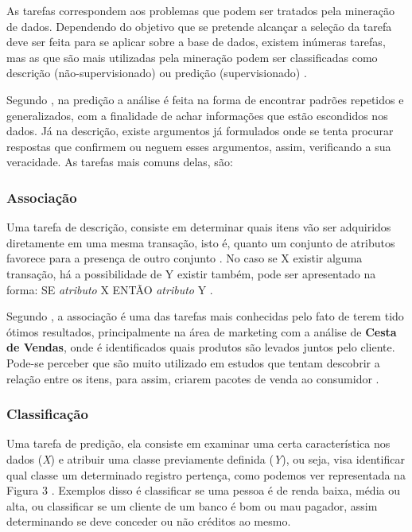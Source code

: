 \par

As tarefas correspondem aos problemas que podem ser tratados pela mineração de dados. Dependendo do objetivo que se pretende alcançar a seleção da tarefa deve ser feita para se aplicar sobre a base de dados, existem inúmeras tarefas, mas as que são mais utilizadas pela mineração podem ser classificadas como descrição (não-supervisionado) ou predição (supervisionado) \cite{Garcia2013, Camilo2009}.

\par
Segundo , na predição a análise é feita na forma de encontrar padrões repetidos e generalizados, com a finalidade de achar informações que estão escondidos nos dados. Já na descrição, existe argumentos já formulados onde se tenta procurar respostas que confirmem ou neguem esses argumentos, assim, verificando a sua veracidade. As tarefas mais comuns delas, são: 


\subsubsection{Associação}

\par
Uma tarefa de descrição, consiste em determinar quais itens vão ser adquiridos diretamente em uma mesma transação, isto é, quanto um conjunto de atributos favorece para a presença de outro conjunto \cite{Garcia2013}. No caso se X existir alguma transação, há a possibilidade de Y existir também, pode ser apresentado na forma: SE \textit{atributo} X ENTÃO \textit{atributo} Y \cite{Camilo2009}. 

\par
Segundo , a associação é uma das tarefas mais conhecidas pelo fato de terem tido ótimos resultados, principalmente na área de marketing com a análise de \textbf{Cesta de Vendas}, onde é identificados quais produtos são levados juntos pelo cliente. Pode-se perceber que são muito utilizado em estudos que tentam descobrir a relação entre os itens, para assim, criarem pacotes de venda ao consumidor \cite{Garcia2013}. 


\subsubsection{Classificação}

\par
Uma tarefa de predição, ela consiste em examinar uma certa característica nos dados (\textit{X}) e atribuir uma classe previamente definida (\textit{Y}), ou seja, visa identificar qual classe um determinado registro pertença, como podemos ver representada na Figura 3 \cite{Garcia2013, Kampff2013}. Exemplos disso é classificar se uma pessoa é de renda baixa, média ou alta, ou classificar se um cliente de um banco é bom ou mau pagador, assim determinando se deve conceder ou não créditos ao mesmo.

